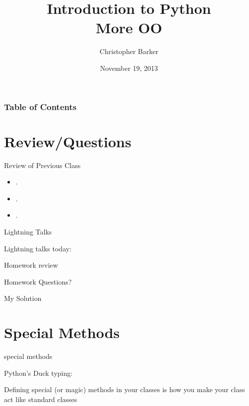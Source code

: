 \documentclass{beamer}
\title[Intro to Python: Week 8]{Introduction  to Python\\ More OO}
\author{Christopher Barker}
\institute{UW Continuing Education}
\date{November 19, 2013}
\begin{document}
\begin{frame}
  \titlepage
\end{frame}

\begin{frame}
\frametitle{Table of Contents}
  \tableofcontents
\end{frame}


\section{Review/Questions}

\begin{frame}{Review of Previous Class}

\begin{itemize}
  \item .
  \item .
  \item .
\end{itemize}

\end{frame}


\begin{frame}{Lightning Talks}

\vfill
{\LARGE Lightning talks today:}

\vfill
{\Large
 

\vfill

\vfill

\vfill

}
\vfill

\end{frame}


\begin{frame}{Homework review}

  \vfill
  {\Large Homework Questions? }

  \vfill
  {\Large My Solution}

  \vfill

\end{frame}

\section{Special Methods}

\begin{frame}[fragile]{special methods}

{\Large Python's Duck typing:}

\vfill
{\Large Defining special (or magic) methods in your classes is how you make
your class act like standard classes}

\end{frame} 
\end{document}

